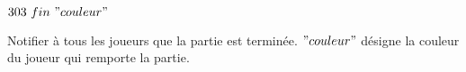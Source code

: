 \par

$303 ~ fin ~ "couleur"$

Notifier à tous les joueurs que la partie est terminée. $"couleur"$ désigne la couleur du joueur qui remporte la partie. \\